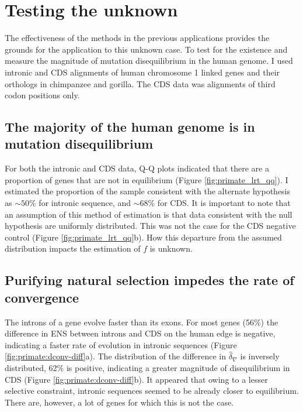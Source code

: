 \section{Testing the unknown}

The effectiveness of the methods in the previous applications provides the grounds for the application to this unknown case. To test for the existence and measure the magnitude of mutation disequilibrium in the human genome. I used intronic and CDS alignments of human chromosome 1 linked genes and their orthologs in chimpanzee and gorilla. The CDS data was alignments of third codon positions only. 

\subsection{The majority of the human genome is in mutation disequilibrium}

For both the intronic and CDS data, Q-Q plots indicated that there are a proportion of genes that are not in equilibrium (Figure \ref{fig:primate_lrt_qq}). I estimated the proportion of the sample consistent with the alternate hypothesis as $\sim50\%$ for intronic sequence, and $\sim68\%$ for CDS. It is important to note that an assumption of this method of estimation is that data consistent with the null hypothesis are uniformly distributed. This was not the case for the CDS negative control (Figure \ref{fig:primate_lrt_qq}b). How this departure from the assumed distribution impacts the estimation of $f$ is unknown. 



\subsection{Purifying natural selection impedes the rate of convergence}

The introns of a gene evolve faster than its exons. For most genes (56\%) the difference in ENS between introns and CDS on the human edge is negative, indicating a faster rate of evolution in intronic sequences (Figure \ref{fig:primate:dconv-diff}a). The distribution of the difference in $\hat\delta_\nabla$ is inversely distributed, 62\% is positive, indicating a greater magnitude of disequilibrium in CDS (Figure \ref{fig:primate:dconv-diff}b). It appeared that owing to a lesser selective constraint, intronic sequences seemed to be already closer to equilibrium. There are, however, a lot of genes for which this is not the case.

